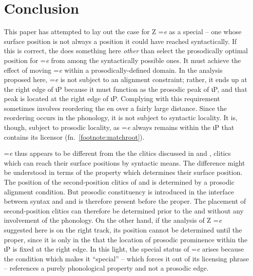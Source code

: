 \documentclass[output=paper,
modfonts
]{LSP/langsci}
\begin{document}
\section{Conclusion}
This paper has attempted to lay out the case for Z  =\emph{e} as a special   --  
one whose surface position is not always a position it could have reached syntactically. If this is correct, the  does something here \emph{other} than select the prosodically optimal position for =\emph{e} from among the syntactically possible ones. It must achieve the effect of moving =\emph{e} within a prosodically-defined domain. In the analysis proposed here, =\emph{e} is not subject to an alignment constraint; rather, it ends up at the right edge of ιP because it must function as the prosodic peak of ιP, and that peak is located at the right edge of ιP. Complying with this requirement sometimes involves reordering the en over a fairly large distance. Since the reordering occurs in the phonology, it is not subject to syntactic locality. It is, though, subject to prosodic locality, as =\emph{e} always remains within the ιP  that contains its licensor 
(fn.~\ref{footnote:matchroot}). 

 =\emph{e} thus appears to be different from the the  clitics discussed in \citet{boskovic2000} and \citet{otero2011}, clitics which can reach their surface positions by syntactic means. The difference might be understood in terms of the property which determines their surface position. The position of the second-position clitics of  and  is determined by a prosodic alignment condition. But prosodic constituency is introduced in the interface between syntax and  and is therefore present before the  proper.  The placement of second-position clitics can therefore be determined prior to the  and without any involvement of the phonology.  On the other hand, if the analysis of Z  =\emph{e} suggested here is on the right track, its position  cannot be determined until the  proper, since it is only in the  that the location of prosodic prominence within the ιP is fixed at the right edge. In this light, the special  status of =\emph{e} arises because the condition which makes it ``special''  --  which forces it out of its licensing phrase  --  references a purely phonological property and not a prosodic edge.  \\
\end{document}
